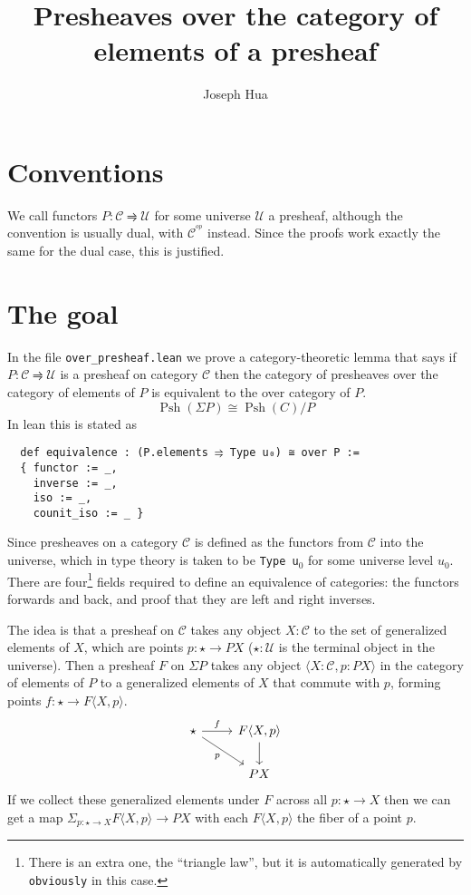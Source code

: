\documentclass{article}
\DeclareMathOperator{\PSh}{Psh}
\newcommand{\functor}{\rightrightharpoons}
\newcommand{\CC}{\mathcal{C}}
\newcommand{\UU}{\mathcal{U}}
\newcommand{\op}{^{op}}
\newcommand{\iso}{\cong}
\newcommand{\<}{\langle}
\renewcommand{\>}{\rangle}
\theoremstyle{definitionstyle}
\theoremstyle{exercisestyle}
\theoremstyle{remarkstyle}
\begin{document}
\title{Presheaves over the category of elements of a presheaf}
\author{Joseph Hua}
\maketitle

\section{Conventions}

We call functors $P : \CC \functor \UU$ for some universe $\UU$
a presheaf, although the convention is usually dual, with $\CC^{\op}$ instead.
Since the proofs work exactly the same for the dual case, this is justified.

\section{The goal}

In the file \texttt{over\_presheaf.lean} we prove a category-theoretic lemma
that says if $P : \CC \functor \UU$ is a presheaf on category $\CC$ then
the category of presheaves over the category of elements of $P$ is equivalent
to the over category of $P$.
\[ \PSh(\Sigma P) \iso \PSh(C) / P \]
In lean this is stated as

\begin{lstlisting}
  def equivalence : (P.elements ⥤ Type u₀) ≅ over P :=
  { functor := _,
    inverse := _,
    iso := _,
    counit_iso := _ } \end{lstlisting}

Since presheaves on a category $\CC$ is defined as the functors
from $\CC$ into the universe, which in type theory is taken to be
\texttt{Type u}$_{0}$ for some universe level $u_{0}$.
There are four\footnote{There is an extra one, the ``triangle law'',
  but it is automatically generated by \texttt{obviously} in this case.}
fields required to define an equivalence of
categories: the functors forwards and back, and proof that they are left and
right inverses.

The idea is that a presheaf on $\CC$ takes any object $X : \CC$ to
the set of generalized elements of $X$, which are points
$p : \star \to P X$ ($\star : \UU$ is the terminal object in the universe).
Then a presheaf $F$ on $\Sigma P$ takes any object
$\< X : \CC , p : P X \>$ in the category of elements of $P$ to a
generalized elements of $X$ that commute with $p$,
forming points $f : \star \to F\< X , p \>$.
\[\begin{tikzcd}
	\star & F\<X,p\> \\
        & P X
	\arrow["f", from=1-1, to=1-2]
	\arrow["p"', from=1-1, to=2-2]
	\arrow[from=1-2, to=2-2]
\end{tikzcd}\]
If we collect these generalized elements under $F$
across all $p : \star \to X$ then we can get a map
$\Sigma_{p : \star \to X} F\< X , p \> \to P X$
with each $F\< X , p \>$ the fiber of a point $p$.
\end{document}
